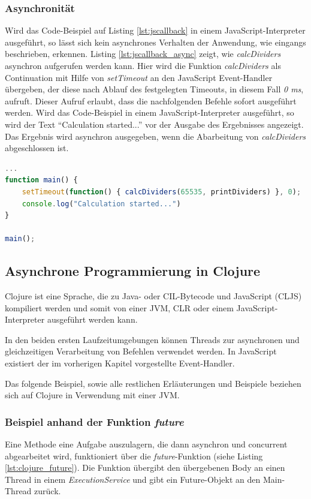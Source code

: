 \documentclass[12pt,a4paper,parskip=half,listof=totoc]{scrreprt}
\begin{document}
\subsubsection*{Asynchronität}
Wird das Code-Beispiel auf Listing \ref{lst:jscallback} in einem JavaScript-Interpreter ausgeführt, so lässt sich kein asynchrones Verhalten der Anwendung, wie eingangs beschrieben, erkennen. Listing \ref{lst:jscallback_async} zeigt, wie \textit{calcDividers} asynchron aufgerufen werden kann. Hier wird die Funktion \mbox{\textit{calcDividers}} als Continuation mit Hilfe von \textit{setTimeout} an den JavaScript Event-Handler übergeben, der diese nach Ablauf des festgelegten Timeouts, in diesem Fall \textit{0 ms}, aufruft. Dieser Aufruf erlaubt, dass die nachfolgenden Befehle sofort ausgeführt werden. Wird das Code-Beispiel in einem JavaScript-Interpreter ausgeführt, so wird der Text ``Calculation started...'' vor der Ausgabe des Ergebnisses angezeigt. Das Ergebnis wird asynchron ausgegeben, wenn die Abarbeitung von \textit{calcDividers} abgeschlossen ist.
\begin{lstlisting}[language=JavaScript,caption=JavaScript setTimeout Beispiel,label=lst:jscallback_async]
...
function main() {
	setTimeout(function() { calcDividers(65535, printDividers) }, 0);
	console.log("Calculation started...")
}

main();
\end{lstlisting}

\subsection{Asynchrone Programmierung in Clojure}

Clojure ist eine Sprache, die zu Java- oder CIL-Bytecode und JavaScript (\acl{CLJS}) kompiliert werden und somit von einer \ac{JVM}, \ac{CLR} oder einem JavaScript-Interpreter ausgeführt werden kann.

In den beiden ersten Laufzeitumgebungen können Threads zur asynchronen und gleichzeitigen Verarbeitung von Befehlen verwendet werden. In JavaScript existiert der im vorherigen Kapitel vorgestellte Event-Handler.

Das folgende Beispiel, sowie alle restlichen Erläuterungen und Beispiele beziehen sich auf Clojure in Verwendung mit einer \ac{JVM}.

\subsubsection*{Beispiel anhand der Funktion \textit{future}}
Eine Methode eine Aufgabe auszulagern, die dann asynchron und concurrent abgearbeitet wird, funktioniert über die \textit{future}-Funktion (siehe Listing \ref{lst:clojure_future}). Die Funktion übergibt den übergebenen Body an einen Thread in einem \textit{ExecutionService} und gibt ein Future-Objekt an den Main-Thread zurück.
\end{document}
